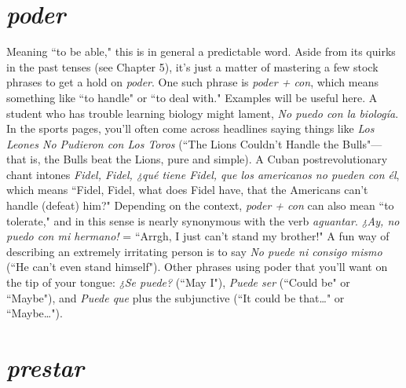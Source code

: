 \section{\emph{poder}}

Meaning ``to be able," this is in general a predictable word.
Aside from its quirks in the past tenses (see Chapter 5), it's just a matter of mastering a few stock phrases to get a hold on \emph{poder}. One such
phrase is \emph{poder + con}, which means something like ``to handle" or ``to
deal with." Examples will be useful here. A student who has trouble
learning biology might lament, \emph{No puedo con la biología}. In the sports
pages, you'll often come across headlines saying things like \emph{Los Leones
	No Pudieron con Los Toros} (``The Lions Couldn't Handle the Bulls"---
that is, the Bulls beat the Lions, pure and simple). A Cuban postrevolutionary chant intones \emph{Fidel, Fidel, ¿qué tiene Fidel, que los americanos no pueden con él}, which means ``Fidel, Fidel, what does Fidel
have, that the Americans can't handle (defeat) him?" Depending on the
context, \emph{poder + con} can also mean ``to tolerate," and in this sense is
nearly synonymous with the verb \emph{aguantar}. \emph{¿Ay, no puedo con mi hermano!} = ``Arrgh, I just can't stand my brother!" A fun way of describing an extremely irritating person is to say \emph{No puede ni consigo mismo}
(``He can't even stand himself"). Other phrases using poder that you'll
want on the tip of your tongue: \emph{¿Se puede?} (``May I"), \emph{Puede ser}
(``Could be" or ``Maybe"), and \emph{Puede que} plus the subjunctive (``It
could be that\ldots{}" or ``Maybe\ldots{}").

\section{\emph{prestar}}

